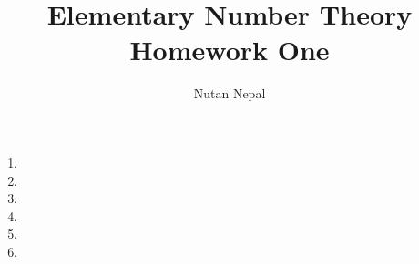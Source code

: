 
\title{Elementary Number Theory\\
        \large Homework One}
\author{Nutan Nepal}

\maketitle
    
    \begin{enumerate}
        \item
    
        \item
    
        \item
    
        \item
    
        \item
    
        \item
    
    \end{enumerate}
    
